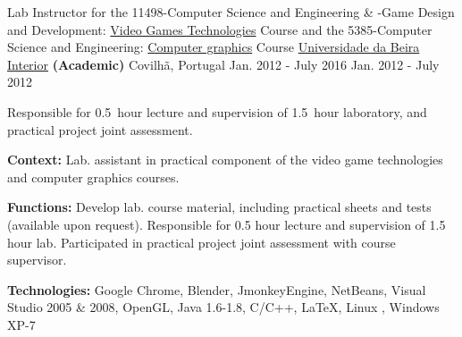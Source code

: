 \begin{cventries}
  \cventry
    {Lab Instructor for the
        11498-Computer Science and Engineering \& -Game Design and Development: 
		\href{http://www.di.ubi.pt/~agomes/tjv/}{Video Games Technologies}	Course 
		\linebreak and the
		5385-Computer Science and Engineering: 		
		\href{http://www.di.ubi.pt/~agomes/cg/}{Computer graphics} Course} %
    {\href{http://www.ubi.pt}{Universidade da Beira Interior} \textbf{(Academic)}} %
    {Covilh\~a, Portugal} %
    {\linebreak Jan. 2012 - July 2016 \linebreak Jan. 2012 - July 2012} %
    {
      \begin{cvitems} %
        \item[] {Responsible for 0.5~hour lecture and supervision of 1.5~hour laboratory, and practical project joint assessment.}%
		\item[] {\textbf{Context:} Lab. assistant in practical component of the video game technologies and computer graphics courses.}
		\item[] {\textbf{Functions:} Develop lab. course material, including practical sheets and tests (available upon request). Responsible for 0.5 hour lecture and supervision of 1.5 hour lab. Participated in practical project joint assessment with course supervisor.}
		\item[] {\textbf{Technologies:} 
		\textcolor{rainbowcolor-olive}{Google Chrome}, 
		\textcolor{rainbowcolor-olive}{Blender}, 
		\textcolor{rainbowcolor-olive}{JmonkeyEngine}, 
		\textcolor{rainbowcolor-olive}{NetBeans}, 		
		\textcolor{rainbowcolor-olive}{Visual Studio 2005 \& 2008},
		\textcolor{rainbowcolor-indigo}{OpenGL}, 
		\textcolor{rainbowcolor-indigo}{Java 1.6-1.8},  
		\textcolor{rainbowcolor-indigo}{C/C++}, 
		\textcolor{rainbowcolor-indigo}{LaTeX}, 
		\textcolor{rainbowcolor-orange}{Linux%
        }, 
		\textcolor{rainbowcolor-orange}{Windows XP-7}}
      \end{cvitems}
    }        
    

\end{cventries}
